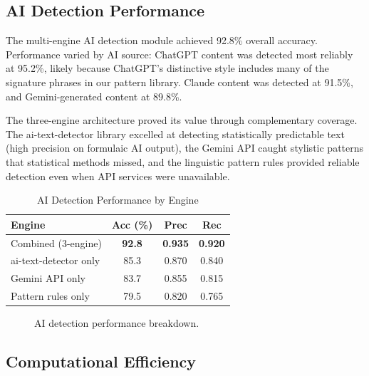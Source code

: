 \documentclass[10pt,twocolumn]{article}
\begin{document}
\subsection{AI Detection Performance}

The multi-engine AI detection module achieved 92.8\% overall accuracy. Performance varied by AI source: ChatGPT content was detected most reliably at 95.2\%, likely because ChatGPT's distinctive style includes many of the signature phrases in our pattern library. Claude content was detected at 91.5\%, and Gemini-generated content at 89.8\%.

The three-engine architecture proved its value through complementary coverage. The ai-text-detector library excelled at detecting statistically predictable text (high precision on formulaic AI output), the Gemini API caught stylistic patterns that statistical methods missed, and the linguistic pattern rules provided reliable detection even when API services were unavailable.

\begin{table}[htbp]
\caption{AI Detection Performance by Engine}
\centering
\small
\begin{tabular}{lccc}
\toprule
\textbf{Engine} & \textbf{Acc (\%)} & \textbf{Prec} & \textbf{Rec} \\
\midrule
Combined (3-engine) & \textbf{92.8} & \textbf{0.935} & \textbf{0.920} \\
ai-text-detector only & 85.3 & 0.870 & 0.840 \\
Gemini API only & 83.7 & 0.855 & 0.815 \\
Pattern rules only & 79.5 & 0.820 & 0.765 \\
\bottomrule
\end{tabular}
\label{tab:ai}
\end{table}

\begin{figure}[htbp]
\centering
\vspace{4cm}
\caption{AI detection performance breakdown.}
\label{fig:ai_perf}
\end{figure}

\subsection{Computational Efficiency}
\end{document}
